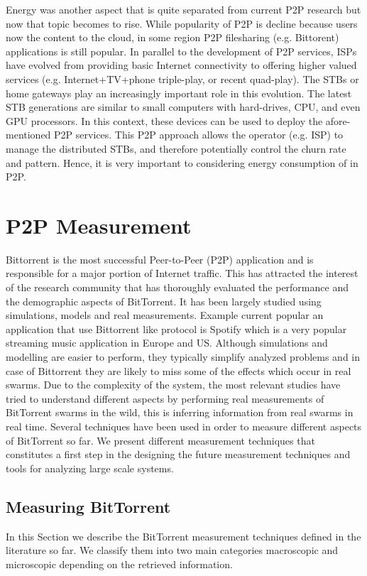 Energy was another aspect that is quite separated from current P2P research but now that topic becomes to rise. 
While popularity of P2P is decline because users now the content to the cloud, in some region P2P filesharing (e.g. Bittorent) applications is still popular.
In parallel to the development of P2P services, ISPs have evolved from providing basic Internet connectivity to offering higher valued services (e.g. Internet+TV+phone triple-play, or recent quad-play). 
The STBs or home gateways play an increasingly important role in this evolution. 
The latest STB generations are similar to small computers with hard-drives, CPU, and even GPU processors. 
In this context, these devices can be used to deploy the afore-mentioned P2P services. 
This P2P approach allows the operator (e.g. ISP) to manage the distributed STBs, and therefore potentially control the churn rate and pattern. 
Hence, it is very important to considering energy consumption of in P2P.





\section{P2P Measurement}

Bittorrent is the most successful Peer-to-Peer (P2P) application and is responsible for a major portion of Internet traffic. 
This has attracted the interest of the research community that has thoroughly evaluated the performance and the demographic aspects of BitTorrent. 
It has been largely studied using simulations, models and real measurements. 
Example current popular an application that use Bittorrent like protocol is Spotify which is a very popular streaming music application in Europe and US.
Although simulations and modelling are easier to perform, they typically simplify analyzed problems and in case of Bittorrent they are likely to miss some of the effects which occur in real swarms. 
Due to the complexity of the system, the most relevant studies have tried to understand different aspects by performing real measurements of BitTorrent swarms in the wild, this is inferring information from real swarms in real time.
Several techniques have been used in order to measure different aspects of BitTorrent so far. 
We present different measurement techniques that constitutes a first step in the designing the future measurement techniques and tools for analyzing large scale systems.

\subsection{Measuring BitTorrent}
In this Section we describe the BitTorrent measurement techniques defined in the literature so far. 
We classify them into two main categories macroscopic and microscopic depending on the retrieved information. 


